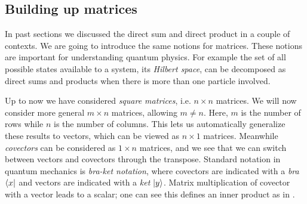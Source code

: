 \subsection{Building up matrices}\label{sec:buildingMatrices}

In past sections we discussed the direct sum and direct product
in a couple of contexts. We are going to introduce the same notions
for matrices. These notions are important for understanding quantum
physics. For example the set of all possible states available
to a system, its {\it Hilbert space}, can
be decomposed as direct sums and products when there is more
than one particle involved.


Up to now we have considered {\it square matrices},
i.e. $n\times n$ matrices. We will now consider more general
$m\times n$ matrices, allowing $m\neq n$. Here, $m$ is the number
of rows while $n$ is the number of columns. This lets us automatically
generalize these results to vectors, which can be viewed as
$n\times 1$ matrices. Meanwhile {\it covectors}
can be considered as $1\times n$ matrices, and we see that we can switch
between vectors and covectors through the transpose. Standard notation
in quantum mechanics is {\it bra-ket notation},
where covectors are indicated with a {\it bra} $\bra{x}$ and
vectors are indicated with a {\it ket} $\ket{y}$.
Matrix multiplication of covector with a vector leads to a scalar;
one can see this defines an inner product as in .


